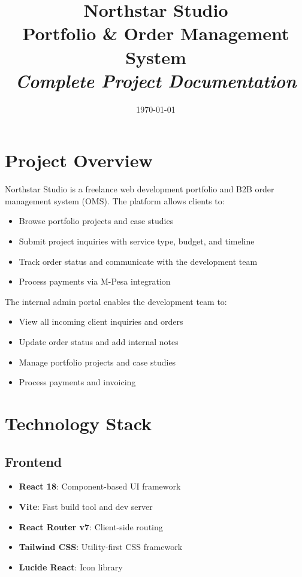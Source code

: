 \documentclass[12pt]{article}
\title{\textbf{Northstar Studio} \\ Portfolio \& Order Management System \\ \textit{Complete Project Documentation}}
\author{}
\date{\today}
\begin{document}
\maketitle

\tableofcontents
\newpage

\section{Project Overview}

Northstar Studio is a freelance web development portfolio and B2B order management system (OMS). The platform allows clients to:
\begin{itemize}
  \item Browse portfolio projects and case studies
  \item Submit project inquiries with service type, budget, and timeline
  \item Track order status and communicate with the development team
  \item Process payments via M-Pesa integration
\end{itemize}

The internal admin portal enables the development team to:
\begin{itemize}
  \item View all incoming client inquiries and orders
  \item Update order status and add internal notes
  \item Manage portfolio projects and case studies
  \item Process payments and invoicing
\end{itemize}

\section{Technology Stack}

\subsection{Frontend}
\begin{itemize}
  \item \textbf{React 18}: Component-based UI framework
  \item \textbf{Vite}: Fast build tool and dev server
  \item \textbf{React Router v7}: Client-side routing
  \item \textbf{Tailwind CSS}: Utility-first CSS framework
  \item \textbf{Lucide React}: Icon library
\end{itemize}
\end{document}
